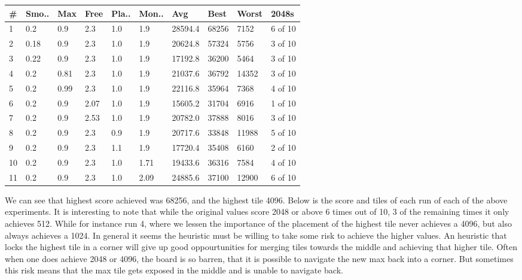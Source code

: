 \begin{center}
    \begin{tabular}{ | l | l | l | l | l | l | l | l | l | l | }
    \hline
    \# & Smo.. & Max & Free & Pla.. & Mon.. & Avg & Best & Worst & 2048s \\  \hline \hline
    1 & 0.2 & 0.9 & 2.3 &  1.0 & 1.9 & 28594.4 & 68256 & 7152 & 6 of 10 \\ \hline \hline
    2 & 0.18 & 0.9 & 2.3 &  1.0 & 1.9 & 20624.8 & 57324 & 5756 & 3 of 10 \\ \hline
    3 & 0.22 & 0.9 & 2.3 &  1.0 & 1.9 & 17192.8 & 36200 & 5464 & 3 of 10 \\ \hline
    4 & 0.2 & 0.81 & 2.3 &  1.0 & 1.9 & 21037.6 & 36792 & 14352 & 3 of 10 \\ \hline
    5 & 0.2 & 0.99 & 2.3 &  1.0 & 1.9 & 22116.8 & 35964 & 7368 & 4 of 10 \\ \hline
    6 & 0.2 & 0.9 & 2.07 &  1.0 & 1.9 & 15605.2 & 31704 & 6916 & 1 of 10 \\ \hline
    7 & 0.2 & 0.9 & 2.53 &  1.0 & 1.9 & 20782.0 & 37888 & 8016 & 3 of 10 \\ \hline
    8 & 0.2 & 0.9 & 2.3 &  0.9 & 1.9 & 20717.6 & 33848 & 11988 & 5 of 10 \\ \hline
    9 & 0.2 & 0.9 & 2.3 &  1.1 & 1.9 & 17720.4 & 35408 & 6160 & 2 of 10 \\ \hline
    10 & 0.2 & 0.9 & 2.3 &  1.0 & 1.71 & 19433.6 & 36316 & 7584 & 4 of 10 \\ \hline
    11 & 0.2 & 0.9 & 2.3 &  1.0 & 2.09 & 24885.6 & 37100 & 12900 & 6 of 10 \\ \hline
    \end{tabular}
\end{center}

We can see that highest score achieved was 68256, and the highest tile 4096. Below
is the score and tiles of each run of each of the above experiments. It is interesting
to note that while the original values score 2048 or above 6 times out of 10, 3 of the
remaining times it only achieves 512. While for instance run 4, where we lessen the
importance of the placement of the highest tile never achieves a 4096, but also always
achieves a 1024. In general it seems the heuristic must be willing to take some risk
to achieve the higher values. An heuristic that locks the highest tile in a corner
will give up good oppourtunities for merging tiles towards the middle and achieving
that higher tile. Often when one does achieve 2048 or 4096, the board is so barren,
that it is possible to navigate the new max back into a corner. But sometimes this
risk means that the max tile gets exposed in the middle and is unable to navigate back.

